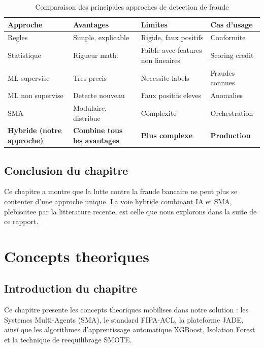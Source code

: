 \documentclass[12pt,a4paper,oneside]{report}
\begin{document}
\begin{table}[H]
\centering
\caption{Comparaison des principales approches de detection de fraude}
\label{tab:comparaison-approches}
\renewcommand{\arraystretch}{1.3}
\begin{tabularx}{\textwidth}{l X X X}
\toprule
\textbf{Approche} & \textbf{Avantages} & \textbf{Limites} & \textbf{Cas d'usage} \\
\midrule
Regles & Simple, explicable & Rigide, faux positifs & Conformite \\
Statistique & Rigueur math. & Faible avec features non lineaires & Scoring credit \\
ML supervise & Tres precis & Necessite labels & Fraudes connues \\
ML non supervise & Detecte nouveau & Faux positifs eleves & Anomalies \\
SMA & Modulaire, distribue & Complexite & Orchestration \\
\textbf{Hybride (notre approche)} & \textbf{Combine tous les avantages} & \textbf{Plus complexe} & \textbf{Production} \\
\bottomrule
\end{tabularx}
\end{table}

\section{Conclusion du chapitre}
Ce chapitre a montre que la lutte contre la fraude bancaire ne peut plus se
contenter d'une approche unique. La voie hybride combinant IA et SMA,
plebiscitee par la litterature recente, est celle que nous explorons dans la
suite de ce rapport.

\chapter{Concepts theoriques}

\section{Introduction du chapitre}
Ce chapitre presente les concepts theoriques mobilises dans notre solution :
les Systemes Multi-Agents (SMA), le standard FIPA-ACL, la plateforme JADE,
ainsi que les algorithmes d'apprentissage automatique XGBoost, Isolation
Forest et la technique de reequilibrage SMOTE.
\end{document}

